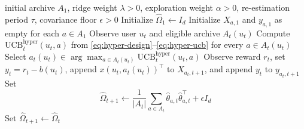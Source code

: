 \documentclass{article} %
\begin{document}
\begin{algorithm}[t]
\caption{Hyper-Ridge PersonalEvo routing}
\label{alg:hyper-ridge-summary}
\begin{algorithmic}[1]
\Require initial archive \(A_1\), ridge weight \(\lambda>0\), exploration weight \(\alpha>0\), re-estimation period \(\tau\), covariance floor \(\epsilon>0\)
\State Initialize \(\widehat{\Omega}_1 \gets I_d\)
\State Initialize \(X_{a,1}\) and \(y_{a,1}\) as empty for each \(a\in A_1\)
    \State Observe user \(u_t\) and eligible archive \(A_t(u_t)\)
    \State Compute \(\mathrm{UCB}_{t}^{\mathrm{hyper}}(u_t,a)\) from \eqref{eq:hyper-design}--\eqref{eq:hyper-ucb} for every \(a\in A_t(u_t)\)
    \State Select \(a_t(u_t)\in \arg\max_{a\in A_t(u_t)}\mathrm{UCB}_{t}^{\mathrm{hyper}}(u_t,a)\)
    \State Observe reward \(r_t\), set \(y_t=r_t-b(u_t)\), append \(x(u_t,a_t(u_t))^\top\) to \(X_{a_t,t+1}\), and append \(y_t\) to \(y_{a_t,t+1}\)
        \State Set
        \[
        \widehat{\Omega}_{t+1}
        \gets
        \frac{1}{|A_t|}
        \sum_{a\in A_t}
        \widehat{\theta}_{a,t}\widehat{\theta}_{a,t}^{\top}
        +
        \epsilon I_d
        \]
    \Else
        \State Set \(\widehat{\Omega}_{t+1}\gets \widehat{\Omega}_t\)
    \EndIf
\EndFor
\end{algorithmic}
\end{algorithm}
\end{document}
